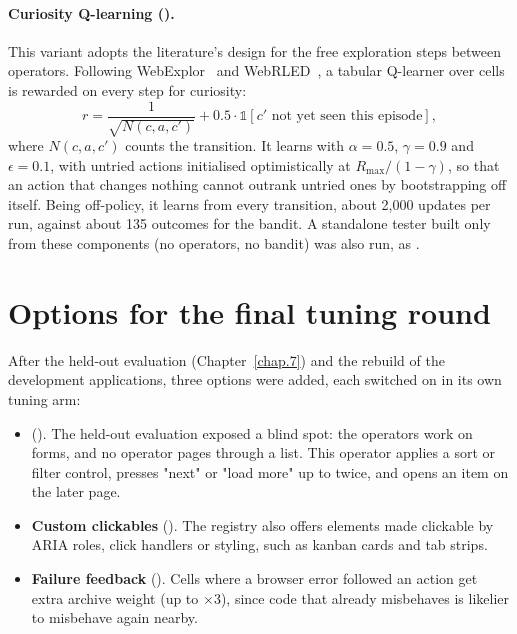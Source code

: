 \paragraph{Curiosity Q-learning ().} This variant adopts the
literature's design for the free exploration steps between operators. Following
WebExplor~\cite{zheng2021webexplor} and WebRLED~\cite{gu2025webrled}, a tabular
Q-learner over cells is rewarded on every step for curiosity:
\begin{equation}
  r = \frac{1}{\sqrt{N(c, a, c')}} + 0.5\cdot\mathbb{1}[c' \text{ not yet seen this episode}],
\end{equation}
where $N(c, a, c')$ counts the transition. It learns with $\alpha = 0.5$, $\gamma = 0.9$ and
$\epsilon = 0.1$, with untried actions initialised optimistically at
$R_{\max}/(1-\gamma)$, so that an action that changes nothing cannot outrank untried ones by
bootstrapping off itself. Being off-policy, it learns from every transition, about 2{,}000
updates per run, against about 135 outcomes for the bandit. A standalone tester built only
from these components (no operators, no bandit) was also run, as
.

\section{Options for the final tuning round}
\label{sec:v3-options}

After the held-out evaluation (Chapter~\ref{chap.7}) and the rebuild of the development
applications, three options were added, each switched on in its own tuning arm:

\begin{itemize}
  \item \textbf{} (). The held-out evaluation
        exposed a blind spot: the operators work on forms, and no operator pages through a
        list. This operator applies a sort or filter control, presses "next" or "load more"
        up to twice, and opens an item on the later page.
  \item \textbf{Custom clickables} (). The registry also offers
        elements made clickable by ARIA roles, click handlers or styling, such as kanban
        cards and tab strips.
  \item \textbf{Failure feedback} (). Cells where a browser
        error followed an action get extra archive weight (up to $\times 3$), since code
        that already misbehaves is likelier to misbehave again nearby.
\end{itemize}

